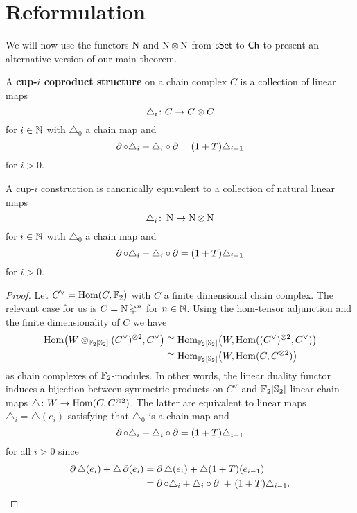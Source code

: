 
\section{Reformulation}

We will now use the functors $\operatorname{N}$ and $\operatorname{N} \otimes \operatorname{N}$ from $\mathsf{sSet}$ to $\mathsf{Ch}$ to present an alternative version of our main theorem.

\begin{definition}
	A \textbf{cup-$i$ coproduct structure} on a chain complex $C$ is a collection of linear maps
	\[
	\triangle_i \colon C \to C \otimes C
	\]
	for $i \in \mathbb{N}$ with $\triangle_0$ a chain map and
	\[
	\operatorname{\partial} \circ \triangle_i + \triangle_i \circ \operatorname{\partial} =
	(1+T) \triangle_{i-1}
	\]
	for $i > 0$.
\end{definition}

\begin{lemma} \label{l:cup-i coproducts}
	A cup-$i$ construction is canonically equivalent to a collection of natural linear maps
	\[
	\triangle_i \colon \operatorname{N} \to \operatorname{N} \otimes \operatorname{N}
	\]
	for $i \in \mathbb{N}$ with $\triangle_0$ a chain map and
	\[
	\operatorname{\partial} \circ \triangle_i + \triangle_i \circ \operatorname{\partial} =
	(1+T) \triangle_{i-1}
	\]
	for $i > 0$.
\end{lemma}

\begin{proof}
	Let $C^\vee = \mathrm{Hom}(C, {\mathbb{F}_2})$ with $C$ a finite dimensional chain complex.
	The relevant case for us is $C = \operatorname{N} \mathbb{\Delta}^n$ for $n \in \mathbb{N}$.
	Using the hom-tensor adjunction and the finite dimensionality of $C$ we have
	\begin{align*}
	\mathrm{Hom} \big(W \otimes_{{\mathbb{F}_2}[\mathbb{S}_2]} (C^\vee)^{\otimes 2}, C^\vee \big) & \cong
	\mathrm{Hom}_{{\mathbb{F}_2}[\mathbb{S}_2]} \big( W, \mathrm{Hom}((C^\vee)^{\otimes 2}, C^\vee) \big) \\ & \cong
	\mathrm{Hom}_{{\mathbb{F}_2}[\mathbb{S}_2]} \big( W, \mathrm{Hom}(C, C^{\otimes 2}) \big)
	\end{align*}
	as chain complexes of ${\mathbb{F}_2}$-modules.
	In other words, the linear duality functor induces a bijection between symmetric products on $C^\vee$ and ${\mathbb{F}_2}[\mathbb{S}_2]$-linear chain maps $\triangle \colon W \to \mathrm{Hom}(C, C^{\otimes 2})$.
	The latter are equivalent to linear maps $\triangle_i = \triangle(e_i)$ satisfying that $\triangle_0$ is a chain map and
	\[
	\operatorname{\partial} \circ \triangle_i + \triangle_i \circ \operatorname{\partial} =
	(1+T) \triangle_{i-1}
	\]
	for all $i > 0$ since
	\begin{align*}
	\operatorname{\partial} \triangle (e_i) + \triangle \operatorname{\partial}(e_i) &=
	\operatorname{\partial} \triangle (e_i) + \triangle (1+T) (e_{i-1}) \\ &=
	\operatorname{\partial} \circ \triangle_i + \triangle_i \circ \operatorname{\partial} \ +\ (1+T) \triangle_{i-1}.
	\end{align*}
\end{proof}

